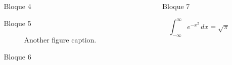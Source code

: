 \documentclass[final]{beamer}
\newlength{\sepwidth}
\newlength{\colwidth}
\newcommand{\separatorcolumn}{\begin{column}{\sepwidth}\end{column}}
\begin{document}
\begin{frame}[t]
\begin{columns}[t]
\separatorcolumn

\begin{column}{\colwidth}
  \begin{block}{Bloque 4}



  \end{block}
  \begin{block}{Bloque 5}

    \begin{figure}
      \centering
      \caption{Another figure caption.}
    \end{figure}

  \end{block}
  \begin{block}{Bloque 6}



  \end{block}

\end{column}

\separatorcolumn

\begin{column}{\colwidth}
  \begin{exampleblock}{Bloque 7}

    $$
    \int_{-\infty}^{\infty} e^{-x^2}\,dx = \sqrt{\pi}
    $$



\end{exampleblock}
\end{column}
\end{columns}
\end{frame}
\end{document}
